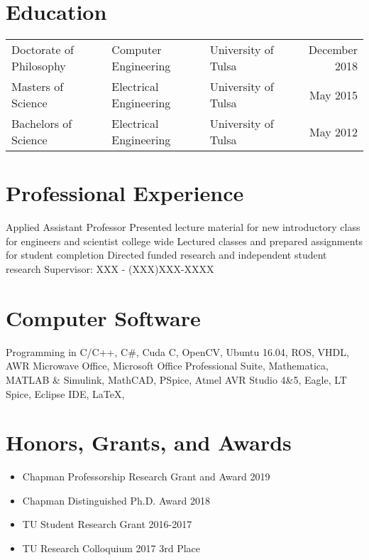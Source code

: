 \documentclass{hutch_resume}
\begin{document}

\section{Education}
\centering\normalsize
\begin{tabular}{lllr}
    Doctorate of Philosophy & Computer Engineering & University of Tulsa & December 2018 \\
    Masters of Science & Electrical Engineering & University of Tulsa & May 2015\\
    Bachelors of Science & Electrical Engineering & University of Tulsa & May 2012
\end{tabular}
\vspace{-.25in}
\section{Professional Experience}
    {Applied Assistant Professor}
    {Presented lecture material for new introductory class for engineers and scientist college wide}
    {Lectured classes and prepared assignments for student completion}
    {Directed funded research and independent student research}
    {Supervisor: XXX - (XXX)XXX-XXXX}

\section{Computer Software}
Programming in C/C++, C\#, Cuda C, OpenCV, Ubuntu 16.04, ROS, VHDL, AWR Microwave Office, Microsoft Office Professional Suite, Mathematica, MATLAB \& Simulink, MathCAD, PSpice, Atmel AVR Studio 4\&5, Eagle, LT Spice, Eclipse IDE, \LaTeX,
\section{Honors, Grants, and Awards}
\begin{itemize}
    \vspace{-.10in}\item Chapman Professorship Research Grant and Award 2019
    \vspace{-.10in}\item Chapman Distinguished Ph.D. Award 2018
    \vspace{-.10in}\item TU Student Research Grant 2016-2017
    \vspace{-.10in}\item TU Research Colloquium 2017 3rd Place
\end{itemize}
\end{document}
